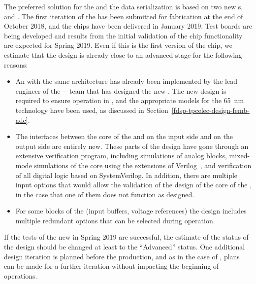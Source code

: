 The preferred solution for the  and the data serialization is based on two new 
s,  and .
The first iteration of the  has been submitted for fabrication
at the end of October 2018, and the chips have been delivered in January 2019.
Test boards are being developed and results from the initial validation of the
chip functionality are expected for Spring 2019. Even if this is the first version
of the chip, we estimate that the design is already close to an advanced stage
for the following reasons:
\begin{itemize}
\item{An  with the same architecture has already been implemented by the
lead engineer of the -- team that has designed the new .
The new design is required to ensure operation in \lar, and the appropriate
models for the \SI{65}{nm} technology have been used, as discussed in
Section~\ref{fdsp-tpcelec-design-femb-adc}.}
\item{The interfaces between the core of the  and  on 
the input side and  on the output side are entirely new.
These parts of the design have gone through an extensive verification
program, including  simulations of analog blocks,
mixed-mode simulations of the core  using the 
extensions of Verilog~\cite{verilog}, and  verification of 
all digital logic based on SystemVerilog. In addition, there are multiple 
input options that would allow the validation of the design of the core 
of the , in the case that one of them does not function as designed.}
\item{For some blocks of the  (input buffers, voltage references) the
design includes multiple redundant options that can be selected during 
operation.}
\end{itemize}
If the tests of the new  in Spring 2019 are successful, the
estimate of the status of the design should be changed at least to the 
``Advanced'' status. One additional design iteration is planned before
the production, and as in the case of , plans can be made for a
further iteration without impacting the beginning of  operations.

